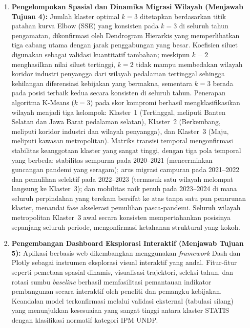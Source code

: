 \begin{enumerate}
    \item \textbf{Pengelompokan Spasial dan Dinamika Migrasi Wilayah (Menjawab Tujuan 4):}
    Jumlah klaster optimal $k=3$ ditetapkan berdasarkan titik patahan kurva Elbow (SSE) yang konsisten pada $k=3$ di seluruh tahun pengamatan, dikonfirmasi oleh Dendrogram Hierarkis yang memperlihatkan tiga cabang utama dengan jarak penggabungan yang besar. Koefisien siluet digunakan sebagai validasi kuantitatif tambahan; meskipun $k=2$ menghasilkan nilai siluet tertinggi, $k=2$ tidak mampu membedakan wilayah koridor industri penyangga dari wilayah pedalaman tertinggal sehingga kehilangan diferensiasi kebijakan yang bermakna, sementara $k=3$ berada pada posisi terbaik kedua secara konsisten di seluruh tahun. Penerapan algoritma K-Means ($k=3$) pada skor kompromi berhasil mengklasifikasikan wilayah menjadi tiga kelompok: Klaster~1 (Tertinggal, meliputi Banten Selatan dan Jawa Barat pedalaman selatan), Klaster~2 (Berkembang, meliputi koridor industri dan wilayah penyangga), dan Klaster~3 (Maju, meliputi kawasan metropolitan). Matriks transisi temporal mengonfirmasi stabilitas keanggotaan klaster yang sangat tinggi, dengan tiga pola temporal yang berbeda: stabilitas sempurna pada 2020--2021 (mencerminkan guncangan pandemi yang seragam); arus migrasi campuran pada 2021--2022 dan pemulihan selektif pada 2022--2023 (termasuk satu wilayah melompat langsung ke Klaster~3); dan mobilitas naik penuh pada 2023--2024 di mana seluruh perpindahan yang terekam bersifat ke atas tanpa satu pun penurunan klaster, menandai fase akselerasi pemulihan pasca-pandemi. Seluruh wilayah metropolitan Klaster~3 awal secara konsisten mempertahankan posisinya sepanjang seluruh periode, mengonfirmasi ketahanan struktural yang kokoh.

    \item \textbf{Pengembangan Dashboard Eksplorasi Interaktif (Menjawab Tujuan 5):}
    Aplikasi berbasis web dikembangkan menggunakan \textit{framework} Dash dan Plotly sebagai instrumen eksplorasi visual interaktif yang andal. Fitur-fitur seperti pemetaan spasial dinamis, visualisasi trajektori, seleksi tahun, dan rotasi sumbu \textit{baseline} berhasil memfasilitasi pemantauan indikator pembangunan secara interaktif oleh peneliti dan pemangku kebijakan. Keandalan model terkonfirmasi melalui validasi eksternal (tabulasi silang) yang menunjukkan kesesuaian yang sangat tinggi antara klaster STATIS dengan klasifikasi normatif kategori IPM UNDP.
\end{enumerate}

